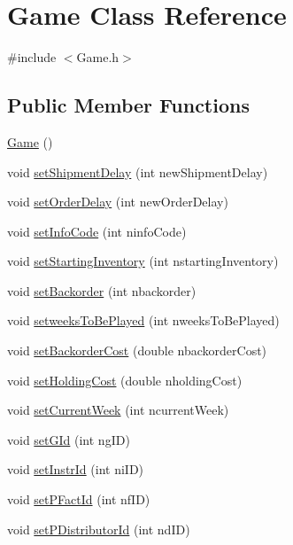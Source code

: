 \hypertarget{classGame}{}\section{Game Class Reference}
\label{classGame}


{\ttfamily \#include $<$Game.\+h$>$}

\subsection*{Public Member Functions}
\begin{DoxyCompactItemize}
\item 
\hyperlink{classGame_ad59df6562a58a614fda24622d3715b65}{Game} ()
\item 
void \hyperlink{classGame_a8c475daf7cf7752185ad5da98907c9ca}{set\+Shipment\+Delay} (int new\+Shipment\+Delay)
\item 
void \hyperlink{classGame_a89df2f584b7ccfdf5c2367bd2ed85920}{set\+Order\+Delay} (int new\+Order\+Delay)
\item 
void \hyperlink{classGame_a886bd4bd86fb77831438cc0b2acd5e96}{set\+Info\+Code} (int ninfo\+Code)
\item 
void \hyperlink{classGame_acab161e982ecf8ab7b3bfb8d4927b89d}{set\+Starting\+Inventory} (int nstarting\+Inventory)
\item 
void \hyperlink{classGame_a7bed0fb500fa97a8b3a30420629a4c38}{set\+Backorder} (int nbackorder)
\item 
void \hyperlink{classGame_a3979fb5baa71d71baf0070a4d3867cb1}{setweeks\+To\+Be\+Played} (int nweeks\+To\+Be\+Played)
\item 
void \hyperlink{classGame_a23c5d1b710b8daa02fe623f709e1f62f}{set\+Backorder\+Cost} (double nbackorder\+Cost)
\item 
void \hyperlink{classGame_a469b669f532f987678463cff63a3d872}{set\+Holding\+Cost} (double nholding\+Cost)
\item 
void \hyperlink{classGame_a894a4b2d874a67fd25b084adc8bf1bc9}{set\+Current\+Week} (int ncurrent\+Week)
\item 
void \hyperlink{classGame_a28f1e26b5927dcf6deaf9c7c2fa2d1d3}{set\+G\+Id} (int ng\+ID)
\item 
void \hyperlink{classGame_ab62c0ccec274f408c3584d353fd0da79}{set\+Instr\+Id} (int ni\+ID)
\item 
void \hyperlink{classGame_a13be14dc30d9abffe0aecad59977dcdc}{set\+P\+Fact\+Id} (int nf\+ID)
\item 
void \hyperlink{classGame_ad42bbcafead378b6fa33110dadf4c67b}{set\+P\+Distributor\+Id} (int nd\+ID)

\end{DoxyCompactItemize}
